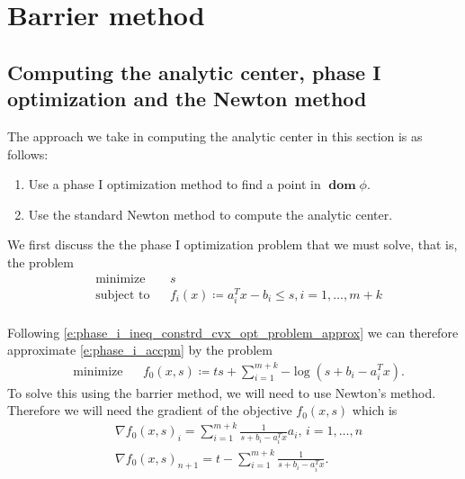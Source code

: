 \documentclass[11pt]{amsart}
\theoremstyle{definition}
\theoremstyle{remark}
\newcommand{\transpose}{T}
\DeclareMathOperator{\domain}{\textbf{dom}}
\begin{document}
\appendix
\section{Barrier method}
 \subsection{Computing the analytic center, phase I optimization and the Newton method}
        The approach we take in computing the analytic center in this section is as follows:
        \begin{enumerate}
            \item Use a phase I optimization method to find a point in $\domain \phi$.
            \item Use the standard Newton method to compute the analytic center.
        \end{enumerate}

        We first discuss the the phase I optimization problem that we must solve, that is, the problem
        \begin{equation}\label{e:phase_i_accpm}
            \begin{aligned}
            & {\text{minimize}} && s  \\
            & \text{subject to} && f_i(x) \coloneqq a_i^\transpose x - b_i \leq s, i = 1, \dots, m+k \\
            \end{aligned}
        \end{equation}

        Following \eqref{e:phase_i_ineq_constrd_cvx_opt_problem_approx} we can therefore approximate \eqref{e:phase_i_accpm} by the problem
        \begin{equation}\label{e:phase_i_accpm_approx}
            \begin{aligned}
            & {\text{minimize}} && 
            f_0(x, s)\coloneqq ts + \sum_{i=1}^{m+k}{-\log(s+b_i - a_i^\transpose x)}.
            \end{aligned}
        \end{equation}
        To solve this using the barrier method, we will need to use Newton's method. Therefore we will need the gradient of the objective $f_0(x, s)$ which is
        \begin{align*}
            &\nabla f_0(x, s)_i = \sum_{i=1}^{m+k} \frac{1}{s+b_i-a_i^\transpose x}a_i \text{, $i = 1, \dots, n$} \\ 
            &\nabla f_0(x, s)_{n+1} = t - \sum_{i=1}^{m+k} \frac{1}{s+b_i-a_i^\transpose x}. 
        \end{align*}
\end{document}
